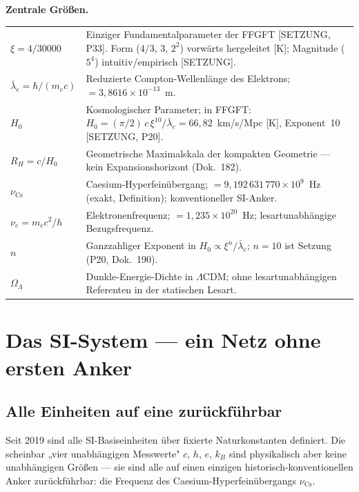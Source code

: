\documentclass[11pt]{report}
\begin{document}
\medskip
\noindent\textbf{Zentrale Größen.}

\medskip
\begin{tabular}{@{}lp{10.5cm}}
$\xi = 4/30000$
  & Einziger Fundamentalparameter der FFGFT [SETZUNG, P33].
    Form ($4/3$, $3$, $2^2$) vorwärts hergeleitet [K];
    Magnitude ($5^4$) intuitiv/empirisch [SETZUNG]. \\[4pt]
$\bar\lambda_e = \hbar/(m_e c)$
  & Reduzierte Compton-Wellenlänge des Elektrons;
    $= 3{,}8616\times10^{-13}$~m. \\[4pt]
$H_0$
  & Kosmologischer Parameter; in FFGFT:
    $H_0 = (\pi/2)\,c\,\xi^{10}/\bar\lambda_e = 66{,}82$~km/s/Mpc
    [K], Exponent~10 [SETZUNG, P20]. \\[4pt]
$R_H = c/H_0$
  & Geometrische Maximalskala der kompakten Geometrie —
    kein Expansionshorizont (Dok.~182). \\[4pt]
$\nu_\text{Cs}$
  & Caesium-Hyperfeinübergang; $= 9{,}192\,631\,770\times10^9$~Hz
    (exakt, Definition); konventioneller SI-Anker. \\[4pt]
$\nu_e = m_e c^2/h$
  & Elektronenfrequenz; $= 1{,}235\times10^{20}$~Hz;
    lesartunabhängige Bezugsfrequenz. \\[4pt]
$n$
  & Ganzzahliger Exponent in $H_0 \propto \xi^n/\bar\lambda_e$;
    $n = 10$ ist Setzung (P20, Dok.~190). \\[4pt]
$\Omega_\Lambda$
  & Dunkle-Energie-Dichte in $\Lambda$CDM;
    ohne lesartunabhängigen Referenten in der statischen Lesart. \\
\end{tabular}

\chapter{Das SI-System — ein Netz ohne ersten Anker}

\section{Alle Einheiten auf eine zurückführbar}

Seit 2019 sind alle SI-Basiseinheiten über fixierte Naturkonstanten
definiert. Die scheinbar „vier unabhängigen Messwerte" $c$, $h$, $e$,
$k_B$ sind physikalisch aber keine unabhängigen Größen — sie sind alle
auf einen einzigen historisch-konventionellen Anker zurückführbar:
die Frequenz des Caesium-Hyperfeinübergangs $\nu_\text{Cs}$.
\end{document}
